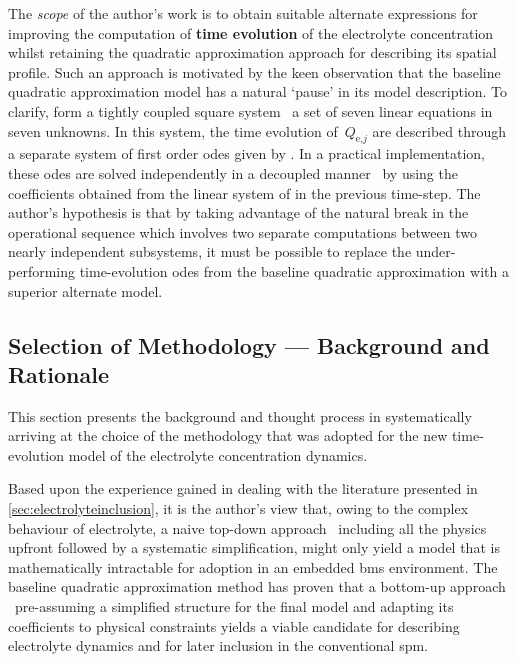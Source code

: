 The  \emph{scope}  of  the  author's   work  is  to  obtain  suitable  alternate
expressions  for  improving  the   computation  of  \textbf{time  evolution}  of
the  electrolyte  concentration  whilst retaining  the  quadratic  approximation
approach   for   describing  its   spatial   profile.   Such  an   approach   is
motivated   by    the   keen    observation   that   the    baseline   quadratic
approximation  model  has  a  natural  `pause'  in  its  model  description.  To
clarify,   form a  tightly
coupled  square  system  \ie~a  set   of  seven  linear  equations  in  seven
unknowns.   In   this   system,   the   time   evolution   of~$Q_{\text{e,}j}$
are   described  through   a  separate   system  of   first  order   \glspl{ode}
given by .  In a
practical  implementation,  these  \glspl{ode}  are solved  independently  in  a
decoupled  manner \ie~by  using  the coefficients  obtained  from the  linear
system of  in the previous
time-step. The  author's hypothesis is that  by taking advantage of  the natural
break  in the  operational  sequence which  involves  two separate  computations
between  two nearly  independent  subsystems,  it must  be  possible to  replace
the  under-performing  time-evolution  \glspl{ode} from  the  baseline  quadratic
approximation with a superior alternate model.

\subsection{Selection of Methodology --- Background and Rationale}\label{subsec:sysidbackground}

This  section presents  the  background and  thought  process in  systematically
arriving  at  the  choice of  the  methodology  that  was  adopted for  the  new
time-evolution model of the electrolyte concentration dynamics.

Based  upon the  experience  gained  in dealing  with  the literature  presented
in \cref{sec:electrolyteinclusion}, it is  the author's view that,  owing to the
complex behaviour of electrolyte, a  naive top-down approach \ie~including all
the physics upfront followed by a  systematic simplification, might only yield a
model that is  mathematically intractable for adoption in  an embedded \gls{bms}
environment.  The baseline  quadratic  approximation method  has  proven that  a
bottom-up approach \ie~pre-assuming a simplified structure for the final model
and adapting its coefficients to  physical constraints yields a viable candidate
for describing electrolyte dynamics and  for later inclusion in the conventional
\gls{spm}.

